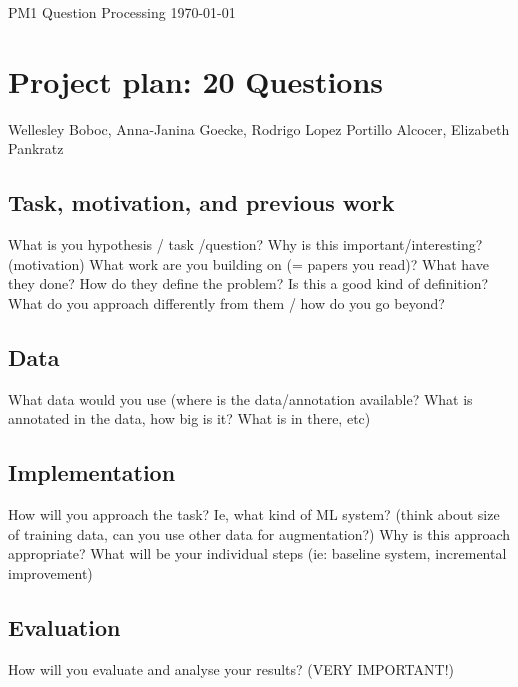\documentclass[a4paper,12pt]{article}
\begin{document}
\noindent PM1 Question Processing \hfill \today

\section*{Project plan: 20 Questions}
\noindent Wellesley Boboc, Anna-Janina Goecke, Rodrigo Lopez Portillo Alcocer, Elizabeth Pankratz

\subsection*{Task, motivation, and previous work}
What is you hypothesis / task /question?
Why is this important/interesting? (motivation)
What work are you building on (= papers you read)?  What have they done? How do they define the problem? Is this a good kind of definition? What do you approach differently from them / how do you go beyond?

\subsection*{Data}
What data would you use (where is the data/annotation available? What is annotated in the data, how big is it? What is in there, etc)

\subsection*{Implementation}
How will you approach the task? Ie, what kind of ML system? (think about size of training data, can you use other data for augmentation?) Why is this approach appropriate? What will be your individual steps (ie: baseline system, incremental improvement)

\subsection*{Evaluation}
How will you evaluate and analyse your results? (VERY IMPORTANT!)

\singlespacing

\printbibliography
\end{document}
